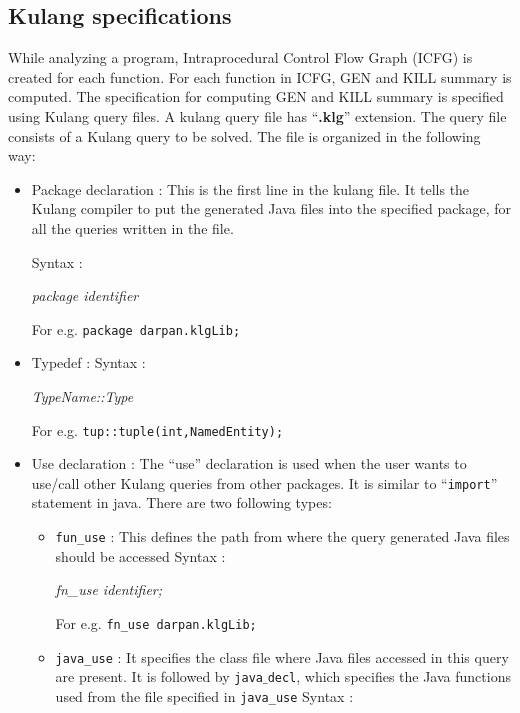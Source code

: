 \documentclass[11pt,a4paper,openright]{report}
\begin{document}
\subsection{Kulang specifications}
While analyzing a program, Intraprocedural Control Flow Graph (ICFG) is created for each function. For each function in ICFG, GEN and KILL summary is computed.
The specification for computing GEN and KILL summary is specified using Kulang query files. A kulang query file has ``\textbf{.klg}'' extension.
The query file consists of a Kulang query to be solved. The file is organized in the following way:
\begin{itemize}
 \item Package declaration : This is the first line in the kulang file. It tells the Kulang compiler to put the generated Java files into the specified package, for
 all the queries written in the file.

 Syntax :
 
\hspace{15mm}\textit{package identifier}

\hspace{15mm} For e.g. \texttt{package darpan.klgLib;}

\item Typedef :\newline 
Syntax : 

\hspace{15mm}\textit{TypeName::Type}

\hspace{15mm}For e.g. \texttt{tup::tuple(int,NamedEntity);}

\item Use declaration : The ``use'' declaration is used when the user wants to use/call other Kulang queries from other packages.
It is similar to ``\texttt{import}'' statement in java. There are two following types:
	\begin{itemize}
	\item \texttt{fun\_use} : This defines the path from where the query generated Java files should be accessed
			  \newline Syntax : 
			  
					    \hspace{15mm} \textit{fn\_use identifier;}
					    
					    \hspace{15mm} For e.g. \texttt{fn\_use darpan.klgLib;}
	\item \texttt{java\_use} : It specifies the class file where Java files accessed in this query are present. It is followed by \texttt{java$\_$decl}, which specifies the Java functions used from the file specified in \texttt{java\_use}
	 \newline Syntax : 
			  

\end{itemize}
\end{itemize}
\end{document}
